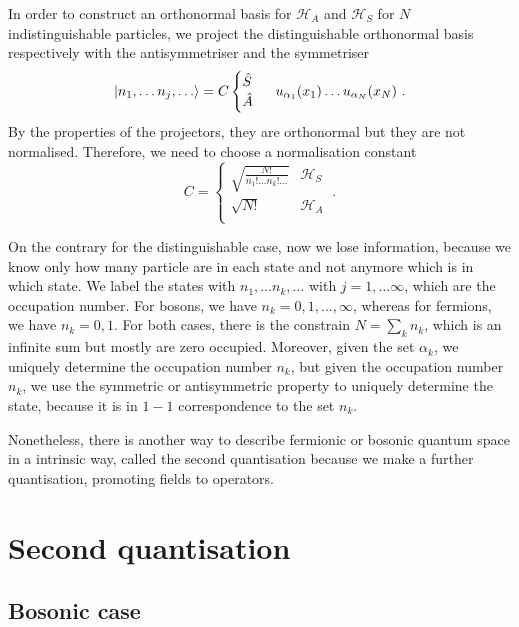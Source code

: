     In order to construct an orthonormal basis for $\mathcal H_A$ and $\mathcal H_S$ for $N$ indistinguishable particles, we project the distinguishable orthonormal basis respectively with the antisymmetriser and the symmetriser
    \begin{equation*}
        \vert n_1, \ldots n_j, \ldots\rangle = C \begin{cases} \hat S \\ \hat A \end{cases} ~ u_{\alpha_1}(x_1) \ldots u_{\alpha_N}(x_N) ~.
    \end{equation*}
    By the properties of the projectors, they are orthonormal but they are not normalised. Therefore, we need to choose a normalisation constant
    \begin{equation*}
        C = \begin{cases}
            \sqrt{\frac{N!}{n_1! \ldots n_k! \ldots}} & \mathcal H_S \\
            \sqrt{N!} & \mathcal H_A \\
        \end{cases} ~.
    \end{equation*}

    On the contrary for the distinguishable case, now we lose information, because we know only how many particle are in each state and not anymore which is in which state. We label the states with $n_1, \ldots n_k, \dots$ with $j=1, \ldots \infty$, which are the occupation number. For bosons, we have $n_k = 0, 1, \ldots, \infty$, whereas for fermions, we have $n_k = 0, 1$. For both cases, there is the constrain $N = \sum_k n_k$, which is an infinite sum but mostly are zero occupied. Moreover, given the set $\alpha_k$, we uniquely determine the occupation number $n_k$, but given the occupation number $n_k$, we use the symmetric or antisymmetric property to uniquely determine the state, because it is in $1-1$ correspondence to the set $n_k$. 

    Nonetheless, there is another way to describe fermionic or bosonic quantum space in a intrinsic way, called the second quantisation because we make a further quantisation, promoting fields to operators.

\chapter{Second quantisation} 

\section{Bosonic case}
   
